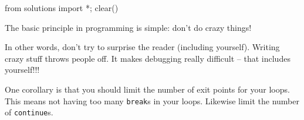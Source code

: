 \begin{python0}
from solutions import *; clear()
\end{python0}

The basic principle in programming is simple: don't do
crazy things!

In other words, don't try to surprise the reader
(including yourself). Writing crazy stuff throws people off. It makes
debugging really difficult -- that includes yourself!!!

One corollary is that you should limit the number of exit points for
your loops. This means not having too many \texttt{break}s in your loops.
Likewise limit the number of \texttt{continue}s.



